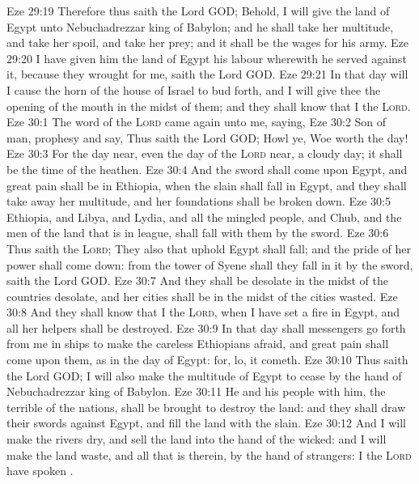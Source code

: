 \vs Eze 29:19 Therefore thus saith the Lord GOD; Behold, I will give the land of Egypt unto Nebuchadrezzar king of Babylon; and he shall take her multitude, and take her spoil, and take her prey; and it shall be the wages for his army.
\vs Eze 29:20 I have given him the land of Egypt  his labour wherewith he served against it, because they wrought for me, saith the Lord GOD.
\vs Eze 29:21 In that day will I cause the horn of the house of Israel to bud forth, and I will give thee the opening of the mouth in the midst of them; and they shall know that I  the \textsc{Lord}.
\vs Eze 30:1 The word of the \textsc{Lord} came again unto me, saying,
\vs Eze 30:2 Son of man, prophesy and say, Thus saith the Lord GOD; Howl ye, Woe worth the day!
\vs Eze 30:3 For the day  near, even the day of the \textsc{Lord}  near, a cloudy day; it shall be the time of the heathen.
\vs Eze 30:4 And the sword shall come upon Egypt, and great pain shall be in Ethiopia, when the slain shall fall in Egypt, and they shall take away her multitude, and her foundations shall be broken down.
\vs Eze 30:5 Ethiopia, and Libya, and Lydia, and all the mingled people, and Chub, and the men of the land that is in league, shall fall with them by the sword.
\vs Eze 30:6 Thus saith the \textsc{Lord}; They also that uphold Egypt shall fall; and the pride of her power shall come down: from the tower of Syene shall they fall in it by the sword, saith the Lord GOD.
\vs Eze 30:7 And they shall be desolate in the midst of the countries  desolate, and her cities shall be in the midst of the cities  wasted.
\vs Eze 30:8 And they shall know that I  the \textsc{Lord}, when I have set a fire in Egypt, and  all her helpers shall be destroyed.
\vs Eze 30:9 In that day shall messengers go forth from me in ships to make the careless Ethiopians afraid, and great pain shall come upon them, as in the day of Egypt: for, lo, it cometh.
\vs Eze 30:10 Thus saith the Lord GOD; I will also make the multitude of Egypt to cease by the hand of Nebuchadrezzar king of Babylon.
\vs Eze 30:11 He and his people with him, the terrible of the nations, shall be brought to destroy the land: and they shall draw their swords against Egypt, and fill the land with the slain.
\vs Eze 30:12 And I will make the rivers dry, and sell the land into the hand of the wicked: and I will make the land waste, and all that is therein, by the hand of strangers: I the \textsc{Lord} have spoken .
